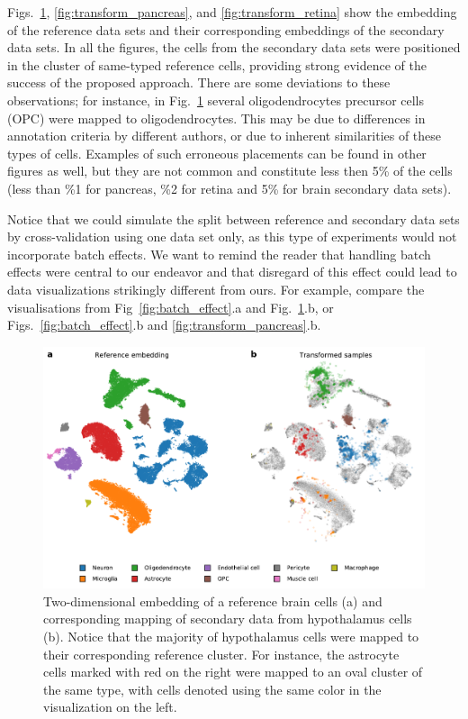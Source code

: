\documentclass[runningheads]{llncs}
\begin{document}
Figs.~\ref{fig:transform_brain}, \ref{fig:transform_pancreas}, and
\ref{fig:transform_retina} show the embedding of the reference data sets and
their corresponding embeddings of the secondary data sets. In all the figures,
the cells from the secondary data sets were positioned in the cluster of
same-typed reference cells, providing strong evidence of the success of the
proposed approach. There are some deviations to these observations; for
instance, in Fig.~\ref{fig:transform_brain} several oligodendrocytes precursor
cells (OPC) were mapped to oligodendrocytes. This may be due to differences in
annotation criteria by different authors, or due to inherent similarities of
these types of cells. Examples of such erroneous placements can be found in
other figures as well, but they are not common and constitute less then 5\% of
the cells (less than \%1 for pancreas, \%2 for retina and 5\% for brain
secondary data sets).

Notice that we could simulate the split between reference and secondary data
sets by cross-validation using one data set only, as this type of experiments
would not incorporate batch effects. We want to remind the reader that handling
batch effects were central to our endeavor and that disregard of this effect
could lead to data visualizations strikingly different from ours. For example,
compare the visualisations from Fig~\ref{fig:batch_effect}.a and
Fig.~\ref{fig:transform_brain}.b, or Figs.~\ref{fig:batch_effect}.b and
\ref{fig:transform_pancreas}.b.

\begin{figure}[htbp]
\includegraphics[width=\textwidth]{figures/transform_brain.pdf}
\caption{Two-dimensional embedding of a reference brain cells (a) and
corresponding mapping of secondary data from hypothalamus cells (b). Notice
that the majority of hypothalamus cells were mapped to their corresponding
reference cluster. For instance, the astrocyte cells marked with red on the
right were mapped to an oval cluster of the same type, with cells denoted using the same
color in the visualization on the left.} \label{fig:transform_brain}
\end{figure}
\end{document}
